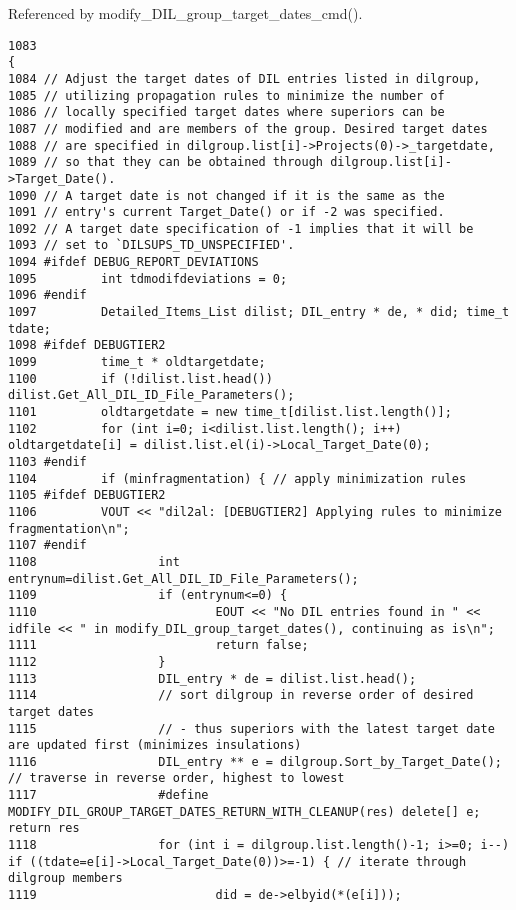 Referenced by modify\_\-DIL\_\-group\_\-target\_\-dates\_\-cmd().



\footnotesize\begin{verbatim}1083                                                                                                  {
1084 // Adjust the target dates of DIL entries listed in dilgroup,
1085 // utilizing propagation rules to minimize the number of
1086 // locally specified target dates where superiors can be
1087 // modified and are members of the group. Desired target dates
1088 // are specified in dilgroup.list[i]->Projects(0)->_targetdate,
1089 // so that they can be obtained through dilgroup.list[i]->Target_Date().
1090 // A target date is not changed if it is the same as the
1091 // entry's current Target_Date() or if -2 was specified.
1092 // A target date specification of -1 implies that it will be
1093 // set to `DILSUPS_TD_UNSPECIFIED'.
1094 #ifdef DEBUG_REPORT_DEVIATIONS
1095         int tdmodifdeviations = 0;
1096 #endif
1097         Detailed_Items_List dilist; DIL_entry * de, * did; time_t tdate;
1098 #ifdef DEBUGTIER2
1099         time_t * oldtargetdate;
1100         if (!dilist.list.head()) dilist.Get_All_DIL_ID_File_Parameters();
1101         oldtargetdate = new time_t[dilist.list.length()];
1102         for (int i=0; i<dilist.list.length(); i++) oldtargetdate[i] = dilist.list.el(i)->Local_Target_Date(0);
1103 #endif
1104         if (minfragmentation) { // apply minimization rules
1105 #ifdef DEBUGTIER2
1106         VOUT << "dil2al: [DEBUGTIER2] Applying rules to minimize fragmentation\n";
1107 #endif
1108                 int entrynum=dilist.Get_All_DIL_ID_File_Parameters();
1109                 if (entrynum<=0) {
1110                         EOUT << "No DIL entries found in " << idfile << " in modify_DIL_group_target_dates(), continuing as is\n";
1111                         return false;
1112                 }
1113                 DIL_entry * de = dilist.list.head();
1114                 // sort dilgroup in reverse order of desired target dates
1115                 // - thus superiors with the latest target date are updated first (minimizes insulations)
1116                 DIL_entry ** e = dilgroup.Sort_by_Target_Date(); // traverse in reverse order, highest to lowest
1117                 #define MODIFY_DIL_GROUP_TARGET_DATES_RETURN_WITH_CLEANUP(res) delete[] e; return res
1118                 for (int i = dilgroup.list.length()-1; i>=0; i--) if ((tdate=e[i]->Local_Target_Date(0))>=-1) { // iterate through dilgroup members
1119                         did = de->elbyid(*(e[i]));

\end{verbatim}
